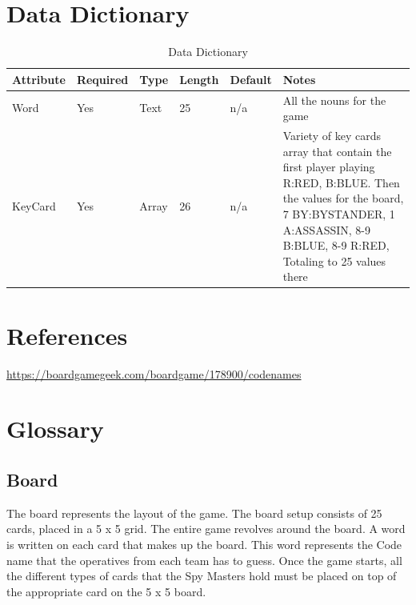 \documentclass[12pt]{article}
\begin{document}
\section{Data Dictionary}
\begin{table}[htbp]
\caption{Data Dictionary}
\begin{center}
\begin{tabularx}{\textwidth}{|l |l |l |l |l |X |}
\hline
Attribute & Required & Type & Length & Default & Notes\\
\hline\hline
Word & Yes & Text & 25 & n/a & All the nouns for the game\\
\hline
KeyCard & Yes & Array & 26 & n/a & Variety of key cards array that contain the first player playing R:RED, B:BLUE. Then the values for the board, 7 BY:BYSTANDER, 1 A:ASSASSIN, 8-9 B:BLUE, 8-9 R:RED, Totaling to 25 values there\\
\hline
\end{tabularx}
\end{center}
\end{table}

\section{References}
\url{https://boardgamegeek.com/boardgame/178900/codenames}

\section{Glossary}





\subsection{Board}
The board represents the layout of the game. The board setup consists of 25 cards, placed in a 5 x 5 grid. The entire game revolves around the board. A word is written on each card that makes up the board. This word represents the Code name that the operatives from each team has to guess. Once the game starts, all the different types of cards that the Spy Masters hold must be placed on top of the appropriate card on the 5 x 5 board. 
\end{document}
